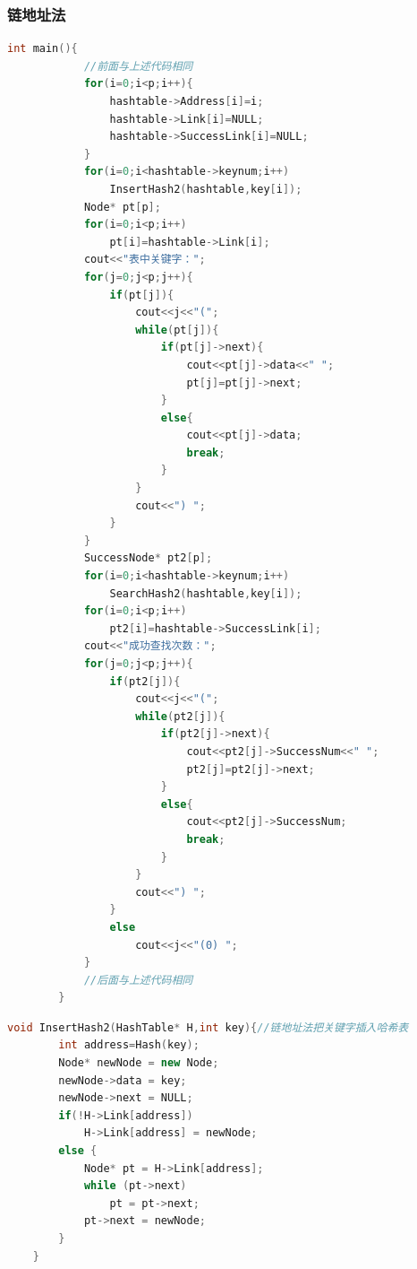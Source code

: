 \documentclass{ctexart}
\begin{document}
	\subsubsection{链地址法}
	\begin{lstlisting}[language=C++, caption=链地址法]
		int main(){
			//前面与上述代码相同
			for(i=0;i<p;i++){
				hashtable->Address[i]=i;
				hashtable->Link[i]=NULL;
				hashtable->SuccessLink[i]=NULL;
			}
			for(i=0;i<hashtable->keynum;i++)
				InsertHash2(hashtable,key[i]);
			Node* pt[p];
			for(i=0;i<p;i++)
				pt[i]=hashtable->Link[i];
			cout<<"表中关键字：";
			for(j=0;j<p;j++){
				if(pt[j]){
					cout<<j<<"(";
					while(pt[j]){
						if(pt[j]->next){
							cout<<pt[j]->data<<" ";
							pt[j]=pt[j]->next;
						}
						else{
							cout<<pt[j]->data;
							break;
						}
					}
					cout<<") ";
				}
			}
			SuccessNode* pt2[p];
			for(i=0;i<hashtable->keynum;i++)
				SearchHash2(hashtable,key[i]);
			for(i=0;i<p;i++)
				pt2[i]=hashtable->SuccessLink[i];
			cout<<"成功查找次数：";
			for(j=0;j<p;j++){
				if(pt2[j]){
					cout<<j<<"(";
					while(pt2[j]){
						if(pt2[j]->next){
							cout<<pt2[j]->SuccessNum<<" ";
							pt2[j]=pt2[j]->next;
						}
						else{
							cout<<pt2[j]->SuccessNum;
							break;
						}
					}
					cout<<") ";
				}
				else
					cout<<j<<"(0) ";
			}
			//后面与上述代码相同
		}
	\end{lstlisting}
	\begin{lstlisting}[language=C++, caption=把关键字插入哈希表]
	void InsertHash2(HashTable* H,int key){//链地址法把关键字插入哈希表
		int address=Hash(key);
		Node* newNode = new Node;
		newNode->data = key;
		newNode->next = NULL;
		if(!H->Link[address])
			H->Link[address] = newNode;
		else {
			Node* pt = H->Link[address];
			while (pt->next) 
				pt = pt->next;
			pt->next = newNode;
		}
	}
	\end{lstlisting}
\end{document}
